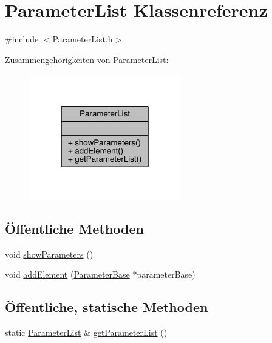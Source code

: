 \hypertarget{class_parameter_list}{}\section{Parameter\+List Klassenreferenz}
\label{class_parameter_list}


{\ttfamily \#include $<$Parameter\+List.\+h$>$}



Zusammengehörigkeiten von Parameter\+List\+:\nopagebreak
\begin{figure}[H]
\begin{center}
\leavevmode
\includegraphics[width=187pt]{class_parameter_list__coll__graph}
\end{center}
\end{figure}
\subsection*{Öffentliche Methoden}
\begin{DoxyCompactItemize}
\item 
void \hyperlink{class_parameter_list_a8402f42970e27ac8618733f507178788}{show\+Parameters} ()
\item 
void \hyperlink{class_parameter_list_a4f4ede7252ae20641befa93cd6c316b3}{add\+Element} (\hyperlink{class_parameter_base}{Parameter\+Base} $\ast$parameter\+Base)
\end{DoxyCompactItemize}
\subsection*{Öffentliche, statische Methoden}
\begin{DoxyCompactItemize}
\item 
static \hyperlink{class_parameter_list}{Parameter\+List} \& \hyperlink{class_parameter_list_ae34f5f9c5a2c8cf9ea216cc733a0a68b}{get\+Parameter\+List} ()
\end{DoxyCompactItemize}


